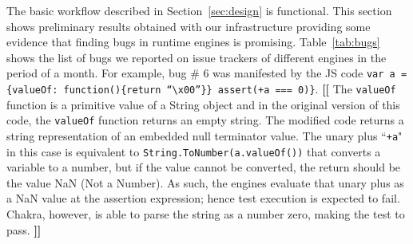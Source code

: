 \documentclass[11pt]{article}
\newcommand{\Igor}[1]{\textbf{[[}{\color{darkaquamarine} #1}\textbf{]]}}
\newcommand{\CodeIn}[1]{{\small\texttt{#1}}}
\begin{document}
The basic workflow described in Section~\ref{sec:design} is functional. This section shows preliminary
results obtained with our infrastructure providing some evidence that finding bugs in runtime engines is
promising. Table~\ref{tab:bugs} shows the list of bugs we reported on
issue trackers of different engines in the period of a month. For
example, bug \# 6 was manifested by the JS code \CodeIn{var a =
  \{valueOf:~function()\{return ``\textbackslash{}x00''\}\} assert(+a
  === 0)\}}. 
\Igor{
  The \CodeIn{valueOf} function is a primitive value of
  a String object and in the original version of this code,
  the \CodeIn{valueOf} function returns an empty string.
  The modified code returns a string representation of an embedded null terminator
  value. 
  The unary plus\cite{unary-plus} ``\CodeIn{+a}" in this case is equivalent to 
  \CodeIn{String.ToNumber(a.valueOf())} that
  converts a variable to a number, but if 
  the value cannot be converted, the return should be the value NaN (Not a Number).
  As such, the engines evaluate that unary plus as a NaN value 
  at the assertion expression; hence test execution is expected to fail. 
  Chakra, however, is able to parse the string as a number zero, making the test to pass.
}
\newcommand{\checkm}{Y}
\newcommand{\crossmark}{N}
\end{document}
